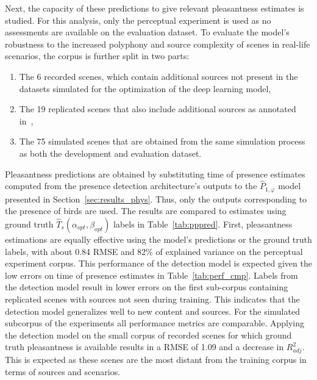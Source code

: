 \documentclass[11pt,a4paper]{article}
\begin{document}
Next, the capacity of these predictions to give relevant pleasantness estimates is studied. For this analysis, only the perceptual experiment is used as no assessments are available on the evaluation dataset. To evaluate the model's robustness to the increased polyphony and source complexity of scenes in real-life scenarios, the corpus is further split in two parts:
\begin{enumerate}
\item The 6 recorded scenes, which contain additional sources not present in the datasets simulated for the optimization of the deep learning model,
\item The 19 replicated scenes that also include additional sources as annotated in~\cite{gloaguen2017},
\item The 75 simulated scenes that are obtained from the same simulation process as both the development and evaluation dataset.
\end{enumerate}
Pleasantness predictions are obtained by substituting time of presence estimates computed from the presence detection architecture's outputs to the $\hat P_{1, \varphi}$ model presented in Section~\ref{sec:results_phys}. Thus, only the outputs corresponding to the presence of birds are used. The results are compared to estimates using ground truth $\hat T_s(\alpha_{opt}, \beta_{opt})$ labels in Table~\ref{tab:pppred}. First, pleasantness estimations are equally effective using the model's predictions or the ground truth labels, with about 0.84 RMSE and 82\% of explained variance on the perceptual experiment corpus. This performance of the detection model is expected given the low errors on time of presence estimates in Table~\ref{tab:perf_cmp}. Labels from the detection model result in lower errors on the first sub-corpus containing replicated scenes with sources not seen during training. This indicates that the detection model generalizes well to new content and sources. For the simulated subcorpus of the experiments all performance metrics are comparable. Applying the detection model on the small corpus of recorded scenes for which ground truth pleasantness is available results in a RMSE of 1.09 and a decrease in $R^2_{adj}$. This is expected as these scenes are the most distant from the training corpus in terms of sources and scenarios.
\end{document}
